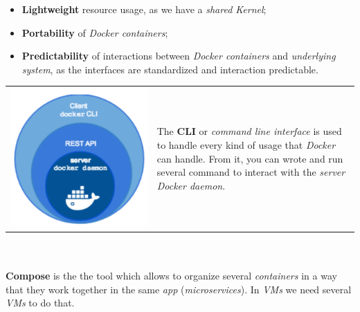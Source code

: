 \documentclass{article}
\begin{document}
\begin{itemize}
\item \textbf{Lightweight} resource usage, as we have a \emph{shared Kernel};
\item \textbf{Portability} of \emph{Docker containers};
\item \textbf{Predictability} of interactions between \emph{Docker containers} and \emph{underlying system}, as the interfaces are standardized and interaction predictable. 
\end{itemize}
\begin{tabular}{C{4cm}  L{10cm}}
        \includegraphics[scale=0.35]{cattura7.png} &  \newline 
        The \textbf{CLI} or \emph{command line interface} is used to handle every kind of usage that \emph{Docker} can handle. From it, you can wrote and run several command to interact with the \emph{server Docker daemon}.  \\
\end{tabular}\\\\
\textbf{Compose} is the the tool which allows to organize several \emph{containers} in a way that they work together in the same \emph{app} (\emph{microservices}). In \emph{VMs} we need several \emph{VMs} to do that. 
\end{document}

